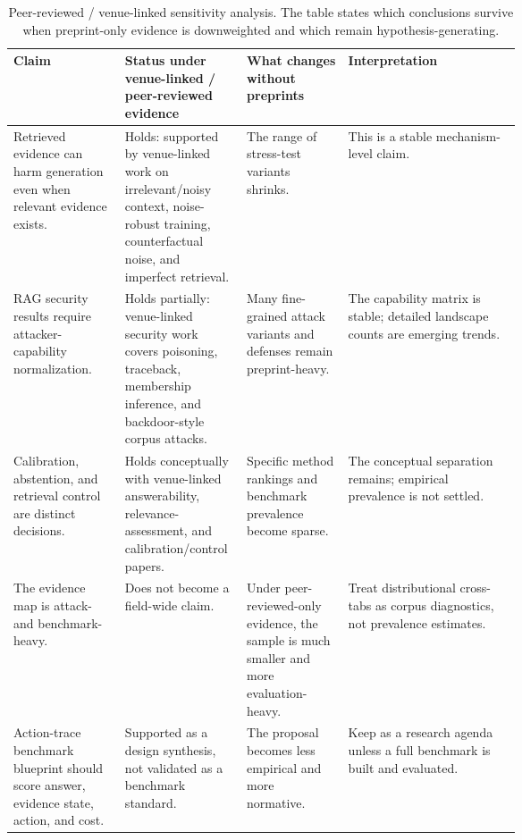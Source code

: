 \begin{table}[t]
\centering
\scriptsize
\renewcommand{\arraystretch}{0.94}
\begin{tabularx}{\linewidth}{>{\raggedright\arraybackslash}p{0.22\linewidth}>{\raggedright\arraybackslash}p{0.24\linewidth}>{\raggedright\arraybackslash}p{0.20\linewidth}X}
\toprule
\textbf{Claim} & \textbf{Status under venue-linked / peer-reviewed evidence} & \textbf{What changes without preprints} & \textbf{Interpretation} \\
\midrule
Retrieved evidence can harm generation even when relevant evidence exists. & Holds: supported by venue-linked work on irrelevant/noisy context, noise-robust training, counterfactual noise, and imperfect retrieval. & The range of stress-test variants shrinks. & This is a stable mechanism-level claim. \\
RAG security results require attacker-capability normalization. & Holds partially: venue-linked security work covers poisoning, traceback, membership inference, and backdoor-style corpus attacks. & Many fine-grained attack variants and defenses remain preprint-heavy. & The capability matrix is stable; detailed landscape counts are emerging trends. \\
Calibration, abstention, and retrieval control are distinct decisions. & Holds conceptually with venue-linked answerability, relevance-assessment, and calibration/control papers. & Specific method rankings and benchmark prevalence become sparse. & The conceptual separation remains; empirical prevalence is not settled. \\
The evidence map is attack- and benchmark-heavy. & Does not become a field-wide claim. & Under peer-reviewed-only evidence, the sample is much smaller and more evaluation-heavy. & Treat distributional cross-tabs as corpus diagnostics, not prevalence estimates. \\
Action-trace benchmark blueprint should score answer, evidence state, action, and cost. & Supported as a design synthesis, not validated as a benchmark standard. & The proposal becomes less empirical and more normative. & Keep as a research agenda unless a full benchmark is built and evaluated. \\
\bottomrule
\end{tabularx}
\caption{Peer-reviewed / venue-linked sensitivity analysis. The table states which conclusions survive when preprint-only evidence is downweighted and which remain hypothesis-generating.}
\label{tab:peer-reviewed-sensitivity}
\end{table}

